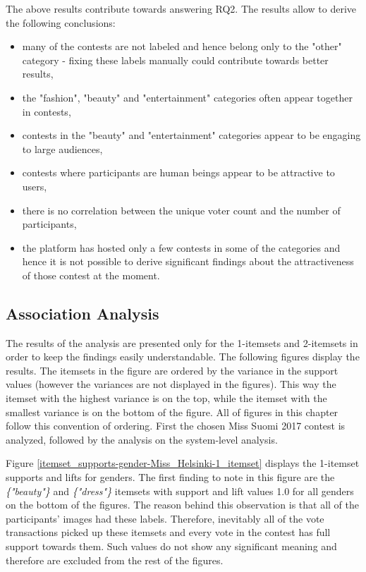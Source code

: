     The above results contribute towards answering RQ2. The results allow to derive the following conclusions: 

    \begin{itemize}
        \item many of the contests are not labeled and hence belong only to the "other" category - fixing these labels manually could contribute towards better results,
        \item the "fashion", "beauty" and "entertainment" categories often appear together in contests,
        \item contests in the "beauty" and "entertainment" categories appear to be engaging to large audiences,
        \item contests where participants are human beings appear to be attractive to users,
        \item there is no correlation between the unique voter count and the number of participants,
        \item the platform has hosted only a few contests in some of the categories and hence it is not possible to derive significant findings about the attractiveness of those contest at the moment.
    \end{itemize}

\subsection{Association Analysis}
The results of the analysis are presented only for the 1-itemsets and 2-itemsets in order to keep the findings easily understandable. The following figures display the results. The itemsets in the figure are ordered by the variance in the support values (however the variances are not displayed in the figures). This way the itemset with the highest variance is on the top, while the itemset with the smallest variance is on the bottom of the figure. All of figures in this chapter follow this convention of ordering. First the chosen Miss Suomi 2017 contest is analyzed, followed by the analysis on the system-level analysis.

Figure \ref{itemset_supports-gender-Miss_Helsinki-1_itemset} displays the 1-itemset supports and lifts for genders. The first finding to note in this figure are the \emph{\{"beauty"\}} and \emph{\{"dress"\}} itemsets with support and lift values 1.0 for all genders on the bottom of the figures. The reason behind this observation is that all of the participants' images had these labels. Therefore, inevitably all of the vote transactions picked up these itemsets and every vote in the contest has full support towards them. Such values do not show any significant meaning and therefore are excluded from the rest of the figures.

